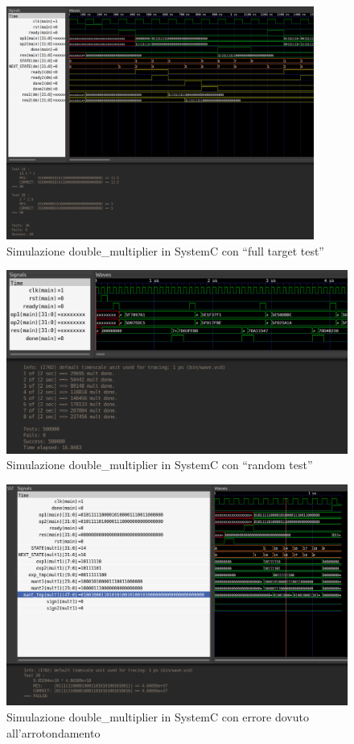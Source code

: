 \documentclass[]{IEEEtran}
\begin{document}
\begin{figure}[bt]
    \centering
    \includegraphics[width=0.9\textwidth]{figures/sc_full}
    \caption{Simulazione double\_multiplier in SystemC con ``full target test''}
    \label{fig:SIM_SC_FULL}
\end{figure}

\begin{figure}[bt]
    \centering
    \includegraphics[width=\textwidth]{figures/sc_rnd}
    \caption{Simulazione double\_multiplier in SystemC con ``random test''}
    \label{fig:SIM_SC_RND}
\end{figure}

\begin{figure}[bt]
    \centering
    \includegraphics[width=\textwidth]{figures/sc_error}
    \caption{Simulazione double\_multiplier in SystemC con errore dovuto all'arrotondamento}
    \label{fig:SIM_SC_ERROR}
\end{figure}
\end{document}
